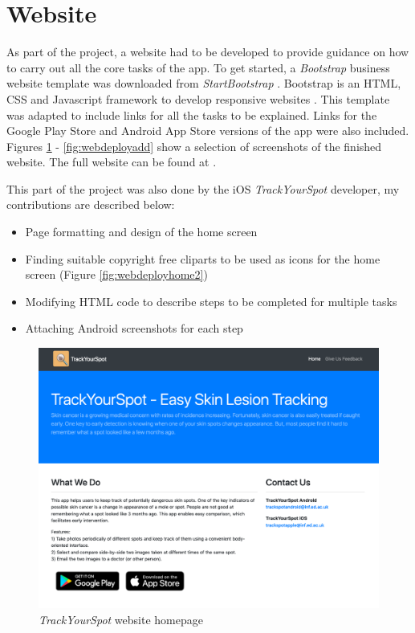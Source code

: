 \section{Website}
As part of the project, a website had to be developed to provide guidance on how to carry out all the core tasks of the app. To get started, a \emph{Bootstrap} business website template was downloaded from \emph{StartBootstrap} \cite{bootstrap}. Bootstrap is an HTML, CSS and Javascript framework to develop responsive websites \cite{twbs_2019}. This template was adapted to include links for all the tasks to be explained. Links for the Google Play Store and Android App Store versions of the app were also included. Figures \ref{fig:webdeployhome} - \ref{fig:webdeployadd} show a selection of screenshots of the finished website. The full website can be found at . 

This part of the project was also done by the iOS \emph{TrackYourSpot} developer, my contributions are described below: 
\begin{itemize}
    \item Page formatting and design of the home screen
    \item Finding suitable copyright free cliparts to be used as icons for the home screen (Figure \ref{fig:webdeployhome2}) 
    \item Modifying HTML code to describe steps to be completed for multiple tasks
    \item Attaching Android screenshots for each step
\end{itemize}


\begin{figure}
    \includegraphics[width=1\textwidth, center]{figures/webdeployhome.png}
    \caption{\emph{TrackYourSpot} website homepage}
    \label{fig:webdeployhome}
\end{figure}

